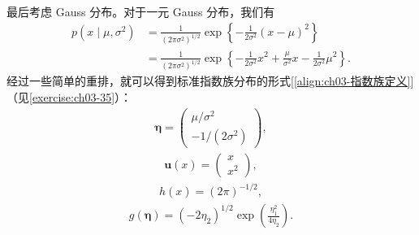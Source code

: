 \documentclass[../../main.tex]{subfiles}
\begin{document}
最后考虑 Gauss 分布。对于一元 Gauss 分布，我们有
\begin{align}
p(x\mid\mu,\sigma^{2})&=\frac{1}{(2\pi\sigma^{2})^{1/2}}\exp\left\{-\frac{1}{2\sigma^{2}}(x-\mu)^{2}\right\}\nonumber\\
&=\frac{1}{(2\pi\sigma^{2})^{1/2}}\exp\left\{-\frac{1}{2\sigma^{2}}x^{2}+\frac{\mu}{\sigma^{2}}x-\frac{1}{2\sigma^{2}}\mu^{2}\right\}.
\label{align:ch03-指数族Gauss展开}
\end{align}
经过一些简单的重排，就可以得到标准指数族分布的形式[\eqref{align:ch03-指数族定义}]（见\cref{exercise:ch03-35}）：
\begin{align}
\boldsymbol{\eta}=\begin{pmatrix}\mu/\sigma^{2}\\ -1/(2\sigma^{2})\end{pmatrix},
\label{align:ch03-Gauss自然参数}
\end{align}
\begin{align}
\boldsymbol{u}(x)=\begin{pmatrix}x\\ x^{2}\end{pmatrix},
\label{align:ch03-Gauss指数族统计量}
\end{align}
\begin{align}
h(x)=(2\pi)^{-1/2},
\label{align:ch03-Gauss基底}
\end{align}
\begin{align}
g(\boldsymbol{\eta})=(-2\eta_2)^{1/2}\exp\left(\frac{\eta_1^{2}}{4\eta_2}\right).
\label{align:ch03-Gauss归一化}
\end{align}
\end{document}
